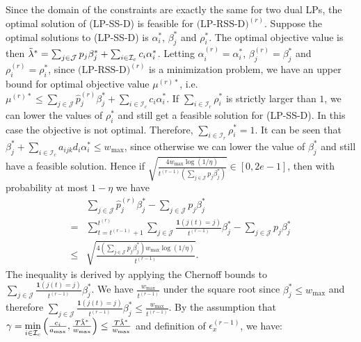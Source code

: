 \documentclass[letterpaper, 10 pt, conference]{ieeeconf}  %
\makeatletter
\renewenvironment{proof}[1][\relax]{\par
  \pushQED{\qed}%
  \normalfont \topsep6\p@\@plus6\p@\relax
  \trivlist
  \item[\hskip\labelsep\itshape
    \ifx#1\relax \proofname\else\proofname{} of #1\fi\@addpunct{.}]\ignorespaces
}{%
  \popQED\endtrivlist\@endpefalse
}
\newcommand{\III}{\mathcal{I}}
\newcommand{\JJJ}{\mathcal{J}}
\theoremstyle{plain}
\theoremstyle{definition}
\theoremstyle{remark}
\makeatother
\begin{document}
\begin{proof}[Lemma \ref{olem:3.3}]
Since the domain of the constraints are exactly the same for two dual LPs, the optimal solution of (LP-SS-D) is feasible for $\text{(LP-RSS-D)}^{(r)}$. Suppose the optimal solutions to (LP-SS-D) is $\alpha^*_i$, $\beta^*_j$ and $\rho^*_i$. The optimal objective value is then $\Tilde{\lambda}^* =\sum_{j \in \JJJ} p_j \beta^*_j + \sum_{i \in \III_c} c_i \alpha^*_i$. Letting $\alpha^{(r)}_{i}=\alpha^*_i$, $\beta^{(r)}_{j}=\beta^*_j$ and $\rho^{(r)}_{i}=\rho^*_i$, since $\text{(LP-RSS-D)}^{(r)}$ is a minimization problem, we have an upper bound for optimal objective value $\mu^{(r)*}$, i.e. $\mu^{(r)*} \leq \sum_{j \in \JJJ} \hat{p}^{(r)}_{j} \beta^*_j + \sum_{i \in \III_c} c_i \alpha^*_i$. If $\sum_{i \in \III_r} \rho^*_i$ is strictly larger than $1$, we can lower the values of $\rho^*_i$ and still get a feasible solution for (LP-SS-D). In this case the objective is not optimal. Therefore, $\sum_{i \in \III_r} \rho^*_i=1$. It can be seen that $\beta^*_j + \sum_{i \in \III_c} a_{ijk} d_i \alpha^*_i \leq w_{\max}$, since otherwise we can lower the value of $\beta^*_j$ and still have a feasible solution. Hence if $\sqrt{\frac{4 w_{\max} \log (1/\eta)}{t^{(r-1)}(\sum_{j \in \JJJ} p_j \beta^*_j)}} \in [0,2e-1]$, then with probability at most $1-\eta$ we have
\begin{subequations}
\begin{alignat}{2}
&\sum_{j \in \JJJ} \hat{p}^{(r)}_{j} \beta^*_j - \sum_{j \in \JJJ} p_j \beta^*_j \nonumber \\
= &\sum^{t^{(r)}}_{t=t^{(r-1)}+1} \sum_{j \in \JJJ} \frac{\mathbf{1}(j(t)=j)}{t^{(r-1)}} \beta^*_j - \sum_{j \in \JJJ} p_j \beta^*_j \nonumber \\
\leq &\sqrt{\frac{4(\sum_{j \in \JJJ} p_j \beta^*_j) w_{\max} \log(1/\eta)}{t^{(r-1)}}}. \nonumber
\end{alignat}
\end{subequations}
The inequality is derived by applying the Chernoff bounds to $\sum_{j \in \JJJ} \frac{\mathbf{1}(j(t)=j)}{t^{(r-1)}} \beta^*_j$. We have $\frac{w_{\max}}{t^{(r-1)}}$ under the square root since $\beta^*_j \leq w_{\max}$ and therefore $\sum_{j \in \JJJ} \frac{\mathbf{1}(j(t)=j)}{t^{(r-1)}} \beta^*_j \leq \frac{w_{\max}}{t^{(r-1)}}$. By the assumption that $\gamma = \min\limits_{i \in \III_c} \left(\frac{c_i}{a_{\max}}, \frac{T\Tilde{\lambda}^*}{w_{\max}}\right) \leq \frac{T\Tilde{\lambda}^*}{w_{\max}}$ and definition of $\epsilon^{(r-1)}_{x}$, we have:
\begin{subequations}
\begin{alignat}{2}

\end{alignat}
\end{subequations}
\end{proof}
\end{document}
